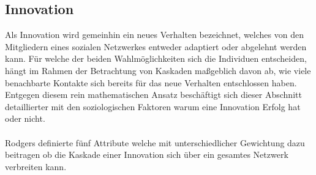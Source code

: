 \documentclass[12pt]{article}
\begin{document}
\subsection{Innovation}
Als Innovation wird gemeinhin ein neues Verhalten bezeichnet, welches von den Mitgliedern eines sozialen Netzwerkes entweder adaptiert oder abgelehnt werden kann. Für welche der beiden Wahlmöglichkeiten sich die Individuen entscheiden, hängt im Rahmen der Betrachtung von Kaskaden maßgeblich davon ab, wie viele benachbarte Kontakte sich bereits für das neue Verhalten entschlossen haben. Entgegen diesem rein mathematischen Ansatz beschäftigt sich dieser Abschnitt detaillierter mit den soziologischen Faktoren warum eine Innovation Erfolg hat oder nicht.\\\\
Rodgers definierte fünf Attribute welche mit unterschiedlicher Gewichtung dazu beitragen ob die Kaskade einer Innovation sich über ein gesamtes Netzwerk verbreiten kann.
\end{document}

